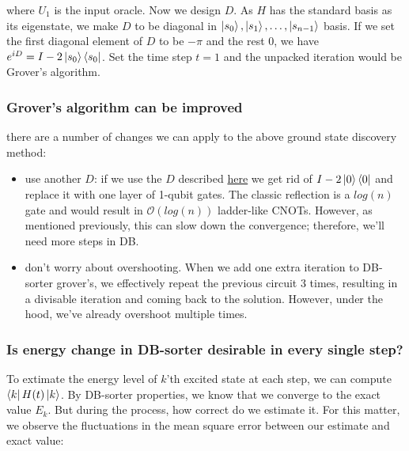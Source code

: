 \documentclass[11pt]{article}
\begin{document}
where $U_1$ is the input oracle. Now we design $D$. As $H$ has the standard basis as its eigenstate, we make $D$ to be diagonal in $\ket{s_0}, \ket{s_1}, \dots, \ket{s_{n-1}}$ basis. If we set the first diagonal element of $D$ to be $-\pi$ and the rest 0, we have $e^{iD} = I - 2\ket{s_0}\bra{s_0}$. Set the time step $t=1$ and the unpacked iteration would be Grover's algorithm.

\subsubsection{Grover's algorithm can be improved}
\label{sec:grover-improvement}
there are a number of changes we can apply to the above ground state discovery method:
\begin{itemize}
    \item use another $D$: if we use the $D$ described \href{https://colab.research.google.com/drive/1jGR1RRAuEHVS-Zpaa9KOCZpvkuE9EALd#scrollTo=plou_wwU8GcA}{here} we get rid of $I - 2\ket{0}\bra{0}$ and replace it with one layer of 1-qubit gates. The classic reflection is a $log(n)$ gate and would result in $\mathcal{O}(log(n))$ ladder-like CNOTs. However, as mentioned previously, this can slow down the convergence; therefore, we'll need more steps in DB.
    \item don't worry about overshooting. When we add one extra iteration to DB-sorter grover's, we effectively repeat the previous circuit 3 times, resulting in a divisable iteration and coming back to the solution. However, under the hood, we've already overshoot multiple times. 
\end{itemize}

\subsubsection{Is energy change in DB-sorter desirable in every single step?}
\label{sec:mean-squared-error}
To extimate the energy level of $k$'th excited state at each step, we can compute $\bra{k} H(t) \ket{k}$. By DB-sorter properties, we know that we converge to the exact value $E_k$. But during the process, how correct do we estimate it. For this matter, we observe the fluctuations in the mean square error between our estimate and exact value:
\end{document}
